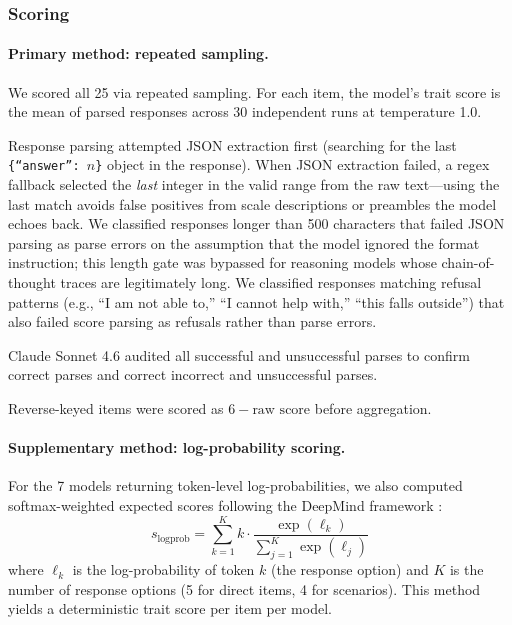 \documentclass[11pt]{article}
\newcommand{\nmodels}{25}
\newcommand{\nruns}{30}
\begin{document}
\subsubsection{Scoring}
\label{sec:scoring}

\paragraph{Primary method: repeated sampling.}
We scored all \nmodels{} via repeated sampling. For each item, the model's trait score is the mean of parsed responses across \nruns{} independent runs at temperature 1.0.

Response parsing attempted JSON extraction first (searching for the last \texttt{\{``answer'': $n$\}} object in the response). When JSON extraction failed, a regex fallback selected the \emph{last} integer in the valid range from the raw text---using the last match avoids false positives from scale descriptions or preambles the model echoes back.
We classified responses longer than 500 characters that failed JSON parsing as parse errors on the assumption that the model ignored the format instruction; this length gate was bypassed for reasoning models whose chain-of-thought traces are legitimately long.
We classified responses matching refusal patterns (e.g., ``I am not able to,'' ``I cannot help with,'' ``this falls outside'') that also failed score parsing as refusals rather than parse errors.

Claude Sonnet 4.6 audited all successful and unsuccessful parses to confirm correct parses and correct incorrect and unsuccessful parses.

Reverse-keyed items were scored as $6 - \text{raw score}$ before aggregation.

\paragraph{Supplementary method: log-probability scoring.}
For the 7 models returning token-level log-probabilities, we also computed softmax-weighted expected scores following the DeepMind framework \citep{serapio2025personality}:
\begin{equation}
  s_{\text{logprob}} = \sum_{k=1}^{K} k \cdot \frac{\exp(\ell_k)}{\sum_{j=1}^{K} \exp(\ell_j)}
\end{equation}
where $\ell_k$ is the log-probability of token $k$ (the response option) and $K$ is the number of response options (5 for direct items, 4 for scenarios).
This method yields a deterministic trait score per item per model.
\end{document}
